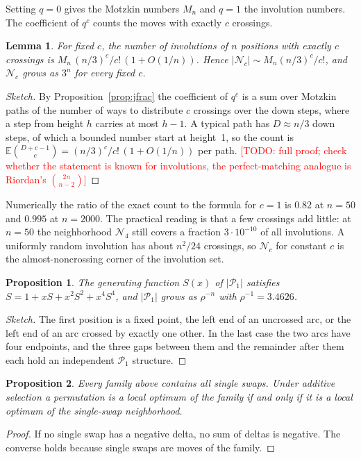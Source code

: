 \documentclass{article}
\newtheorem{proposition}{Proposition}
\newtheorem{lemma}{Lemma}
\newcommand{\todo}[1]{\textcolor{red}{[TODO: #1]}}
\newcommand{\N}{\mathcal{N}}
\newcommand{\Pa}{\mathcal{P}}
\begin{document}
Setting $q=0$ gives the Motzkin numbers $M_n$ and $q=1$ the involution
numbers. The coefficient of $q^c$ counts the moves with exactly $c$
crossings.

\begin{lemma}\label{lem:poisson}
For fixed $c$, the number of involutions of $n$ positions with exactly
$c$ crossings is $M_n\,(n/3)^c/c!\,(1+O(1/n))$. Hence
$|\N_c|\sim M_n(n/3)^c/c!$, and $\N_c$ grows as $3^n$ for every fixed
$c$.
\end{lemma}
\begin{proof}[Sketch]
By Proposition~\ref{prop:jfrac} the coefficient of $q^c$ is a sum over
Motzkin paths of the number of ways to distribute $c$ crossings over the
down steps, where a step from height $h$ carries at most $h-1$. A
typical path has $D\approx n/3$ down steps, of which a bounded number
start at height~1, so the count is
$\mathbb{E}\binom{D+c-1}{c}=(n/3)^c/c!\,(1+O(1/n))$ per path.
\todo{full proof; check whether the statement is known for involutions,
the perfect-matching analogue is Riordan's $\binom{2n}{n-2}$}
\end{proof}

Numerically the ratio of the exact count to the formula for $c=1$ is
$0.82$ at $n=50$ and $0.995$ at $n=2000$. The practical reading is that
a few crossings add little: at $n=50$ the neighborhood $\N_4$ still
covers a fraction $3\cdot10^{-10}$ of all involutions. A uniformly
random involution has about $n^2/24$ crossings, so $\N_c$ for constant
$c$ is the almost-noncrossing corner of the involution set.

\begin{proposition}\label{prop:pa1}
The generating function $S(x)$ of $|\Pa_1|$ satisfies
$S=1+xS+x^2S^2+x^4S^4$, and $|\Pa_1|$ grows as $\rho^{-n}$ with
$\rho^{-1}=3.4626$.
\end{proposition}
\begin{proof}[Sketch]
The first position is a fixed point, the left end of an uncrossed arc,
or the left end of an arc crossed by exactly one other. In the last case
the two arcs have four endpoints, and the three gaps between them and
the remainder after them each hold an independent $\Pa_1$ structure.
\end{proof}

\begin{proposition}\label{prop:optima}
Every family above contains all single swaps. Under additive selection a
permutation is a local optimum of the family if and only if it is a
local optimum of the single-swap neighborhood.
\end{proposition}
\begin{proof}
If no single swap has a negative delta, no sum of deltas is negative.
The converse holds because single swaps are moves of the family.
\end{proof}
\end{document}
